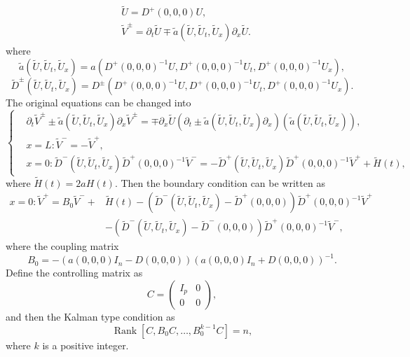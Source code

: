 \documentclass[a4paper,reqno,11pt]{amsart}
\numberwithin{equation}{section} %
\begin{document}
$$
\begin{aligned}
& \tilde{U}=D^{+}(0,0,0) U ,\\
& \tilde{V}^{\pm}=\partial_t \tilde{U} \mp \tilde{a} \left(\tilde{U}, \tilde{U}_t, \tilde{U}_x\right) \partial_x \tilde{U}.
\end{aligned}
$$
where
$$
\tilde{a} \left(\tilde{U} , \tilde{U} _t, \tilde{U} _x\right)=a\left(D^{+}(0,0,0)^{-1} U, D^{+}(0,0,0)^{-1} U_t, D^{+}(0,0,0)^{-1} U_x\right) ,
$$
$$
\tilde{D} ^{\pm}\left(\tilde{U} , \tilde{U} _t, \tilde{U} _x\right)=D^{\pm}\left(D^{+}(0,0,0)^{-1} U, D^{+}(0,0,0)^{-1} U_t, D^{+}(0,0,0)^{-1} U_x\right) .
$$
The original equations can be changed into
\begin{equation}\label{hyperbolic equations}
    \begin{cases}
    & \partial_t \tilde{V} ^{ \pm} \pm \tilde{a} \left(\tilde{U} , \tilde{U} _t, \tilde{U} _x\right) \partial_x \tilde{V} ^{ \pm}=\mp \partial_x \tilde{U} \left(\partial_t \pm \tilde{a} \left(\tilde{U} , \tilde{U} _t, \tilde{U} _x\right) \partial_x\right)\left(\tilde{a} \left(\tilde{U} , \tilde{U} _t, \tilde{U} _x\right)\right) ,\\
    & x=L:\tilde{ V} ^{-}=-\tilde{V} ^{+} ,\\
    & x=0: \tilde{D} ^{-}\left(\tilde{U} , \tilde{U} _t, \tilde{U} _x\right) \tilde{D} ^{+}(0,0,0)^{-1} \tilde{V} ^{-}=-\tilde{D} ^{+}\left(\tilde{U} , \tilde{U} _t, \tilde{U} _x\right) \tilde{D} ^{+}(0,0,0)^{-1} \tilde{V} ^{+}+\tilde{H} (t),
\end{cases}
\end{equation}
where $\tilde{H} (t)=2aH(t)$. Then the boundary condition can be written as
$$
\begin{aligned}
x=0: \widetilde{V}^{+}=B_0 \widetilde{V}^{-}+ & \widetilde{H}(t)-\left(\widetilde{D}^{-}\left(\widetilde{U}, \widetilde{U}_t, \widetilde{U}_x\right)-\widetilde{D}^{+}(0,0,0)\right) \widetilde{D}^{+}(0,0,0)^{-1} \widetilde{V}^{+} \\
& -\left(\widetilde{D}^{-}\left(\widetilde{U}, \widetilde{U}_t, \widetilde{U}_x\right)-\widetilde{D}^{-}(0,0,0)\right) \widetilde{D}^{+}(0,0,0)^{-1} \widetilde{V}^{-},
\end{aligned}
$$
where the coupling matrix 
$$
B_0=-\left(a(0,0,0) I_n-D(0,0,0)\right)\left(a(0,0,0) I_n+D(0,0,0)\right)^{-1} .
$$
Define the controlling matrix as 
$$
C=\left(\begin{array}{cc}
I_p & 0 \\
0 & 0
\end{array}\right) ,
$$
and then the Kalman type condition as
\begin{equation}\label{41}
    \operatorname{Rank}\left[C, B_0 C, \ldots, B_0^{k-1} C\right]=n,
\end{equation}
where $k$ is a positive integer.
\end{document}
